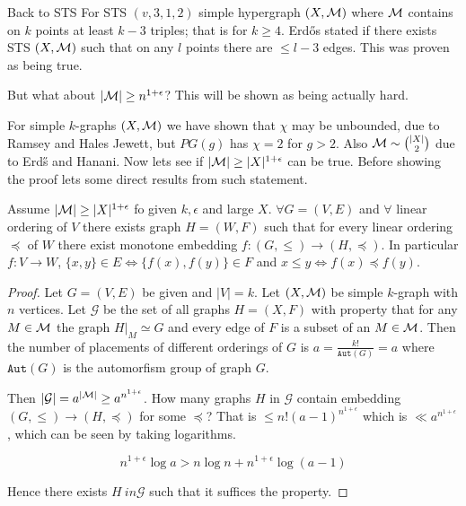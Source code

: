 \begin{topic}{Back to STS}
	For STS $(v,3,1,2)$ simple hypergraph $(X, \mathcal{M})$ where $\mathcal{M}$ contains on $k$ points at least $k-3$ triples; that is for $k \geq 4$. Erd\H os stated if there exists STS $(X, \mathcal{M})$ such that on any $l$ points there are $\leq l-3$ edges. This was proven as being true.
	
	But what about $|\mathcal{M}| \geq n^{1 + \epsilon}$? This will be shown as being actually hard.
\end{topic}

For simple $k$-graphs $(X, \mathcal{M})$ we have shown that $\chi$ may be unbounded, due to Ramsey and Hales Jewett, but $PG(g)$ has $\chi = 2$ for $g > 2$. Also $\mathcal{M} \sim \binom{|X|}{2}$ due to Erd\H s and Hanani. Now lets see if $|\mathcal{M}| \geq |X|^{1 + \epsilon}$ can be true. Before showing the proof lets some direct results from such statement.

\begin{thm}
	Assume $|\mathcal{M}| \geq |X|^{1 + \epsilon}$ fo given $k, \epsilon$ and large $X$. $\forall G = (V,E)$ and $\forall$ linear ordering of $V$ there exists graph $H = (W,F)$ such that for every linear ordering $\preceq$ of $W$ there exist monotone embedding $f : (G, \leq) \to (H, \preceq)$. In particular $f : V \to W$, $\{x,y\} \in E \iff \{f(x), f(y)\} \in F$ and $x \leq y \iff f(x) \preceq f(y)$.
\end{thm}

\begin{proof}
	Let $G = (V,E)$ be given and $|V| = k$. Let $(X, \mathcal{M})$ be simple $k$-graph with $n$ vertices. Let $\mathcal{G}$ be the set of all graphs $H = (X,F)$ with property that for any $M \in \mathcal{M}$ the graph $H|_M \simeq G$ and every edge of $F$ is a subset of an $M \in \mathcal{M}$. Then the number of placements of different orderings of $G$ is $a = \frac{k!}{\mathtt{Aut}(G)} = a$ where $\mathtt{Aut}(G)$ is the automorfism group of graph $G$.
	
	Then $|\mathcal{G}| = a^{|\mathcal{M}|} \geq a^{n^{1+\epsilon}}$. How many graphs $H$ in $\mathcal{G}$ contain embedding $(G, \leq) \to (H, \preceq)$ for some $\preceq$? That is $\leq n! (a - 1)^{n^{1+\epsilon}}$ which is $\ll a^{n^{1+\epsilon}}$, which can be seen by taking logarithms.
	
	$$
	n^{1 + \epsilon} \log a > n \log n + n^{1 + \epsilon} \log(a-1)
	$$
	
	\noindent Hence there exists $H \ in \mathcal{G}$ such that it suffices the property.
\end{proof}

